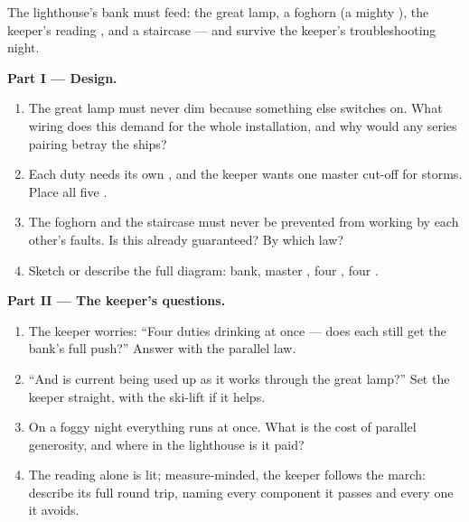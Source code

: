 \begin{problem}\label{pb:g7:circuits-series-parallel:1}
The lighthouse's  bank must feed: the great lamp, a
foghorn (a mighty ), the keeper's reading , and a
staircase  --- and survive the keeper's troubleshooting
night.

\medskip\noindent\textbf{Part I --- Design.}
\begin{enumerate}
  \item The great lamp must never dim because something else
        switches on. What wiring does this demand for the whole
        installation, and why would any series pairing betray
        the ships?
  \item Each duty needs its own , and the keeper wants one
        master cut-off for storms. Place all five .
  \item The foghorn and the staircase  must never be
        prevented from working by each other's faults. Is this
        already guaranteed? By which law?
  \item Sketch or describe the full diagram: bank, master
        , four , four  .
\end{enumerate}

\medskip\noindent\textbf{Part II --- The keeper's questions.}
\begin{enumerate}[resume]
  \item The keeper worries: ``Four duties drinking at once ---
        does each  still get the bank's full push?''
        Answer with the parallel law.
  \item ``And is current being used up as it works through the
        great lamp?'' Set the keeper straight, with the ski-lift
        if it helps.
  \item On a foggy night everything runs at once. What is the
        cost of parallel generosity, and where in the lighthouse
        is it paid?
  \item The reading  alone is lit; measure-minded, the
        keeper follows the march: describe its full round trip,
        naming every component it passes and every one it
        avoids.
\end{enumerate}


\end{problem}
